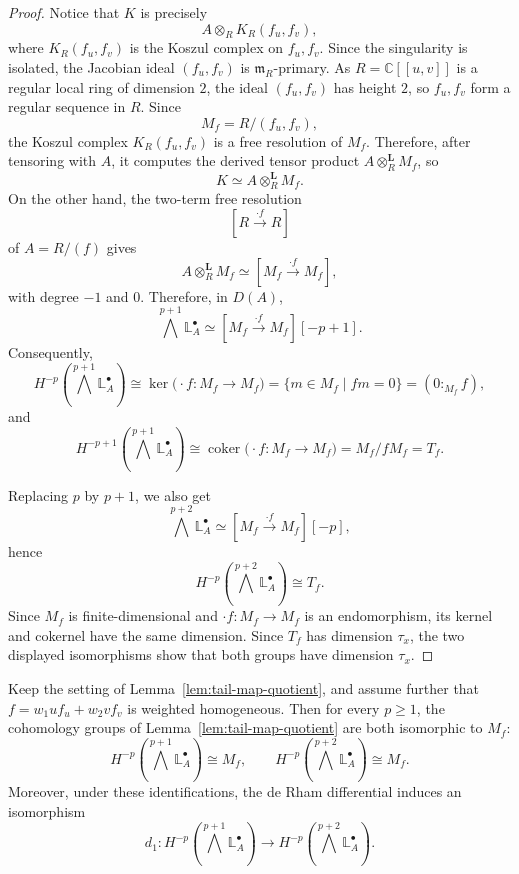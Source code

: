 \documentclass[12pt,reqno]{amsart}
\begin{document}
\begin{proof}
Notice that $K$ is precisely
\[
A\otimes_R K_R(f_u,f_v),
\]
where $K_R(f_u,f_v)$ is the Koszul complex on \(f_u,f_v\). Since the singularity is isolated, the Jacobian ideal \((f_u,f_v)\) is \(\mathfrak m_R\)-primary. As \(R=\mathbb C[[u,v]]\) is a regular local ring of dimension \(2\), the ideal \((f_u,f_v)\) has height \(2\), so \(f_u,f_v\) form a regular sequence in \(R\). Since
\[
M_f=R/(f_u,f_v),
\]
the Koszul complex \(K_R(f_u,f_v)\) is a free resolution of \(M_f\). Therefore, after tensoring with \(A\), it computes the derived tensor product \(A\otimes_R^{\mathbf L}M_f\), so
\[
K \simeq A\otimes_R^{\mathbf L} M_f.
\]
On the other hand, the two-term free resolution
\[
[R\xrightarrow{\cdot f} R]
\]
of $A=R/(f)$ gives
\[
A\otimes_R^{\mathbf L}M_f \simeq [M_f\xrightarrow{\cdot f} M_f],
\]
with degree \(-1\) and \(0\). Therefore, in \(D(A)\),
\[
\bigwedge^{p+1}\mathbb{L}^{\bullet}_A\simeq [M_f\xrightarrow{\cdot f} M_f][-p+1].
\]
Consequently,
\[
  H^{-p}\!\left(\bigwedge^{p+1}\mathbb{L}^{\bullet}_A\right)
  \cong
  \ker\!\bigl(\cdot f:M_f\to M_f\bigr)
  =
  \{m\in M_f\mid fm=0\}
  =(0:_{M_f}f),
  \]
  and
  \[
  H^{-p+1}\!\left(\bigwedge^{p+1}\mathbb{L}^{\bullet}_A\right)
  \cong
  \operatorname{coker}\!\bigl(\cdot f:M_f\to M_f\bigr)
  =M_f/fM_f=T_f.
  \]
  
  Replacing $p$ by $p+1$, we also get
  \[
  \bigwedge^{p+2}\mathbb{L}^{\bullet}_A\simeq [M_f\xrightarrow{\cdot f} M_f][-p],
  \]
  hence
  \[
  H^{-p}\!\left(\bigwedge^{p+2}\mathbb{L}^{\bullet}_A\right)\cong T_f.
  \]
  Since \(M_f\) is finite-dimensional and \(\cdot f:M_f\to M_f\) is an endomorphism, its kernel and cokernel have the same dimension. Since \(T_f\) has dimension \(\tau_x\), the two displayed isomorphisms show that both groups have dimension \(\tau_x\).
  \end{proof}

\begin{lemma}\label{lem:tail-map-euler}
Keep the setting of Lemma~\ref{lem:tail-map-quotient}, and assume further that \(f=w_1u f_u+w_2v f_v\) is weighted homogeneous. Then for every $p\ge 1$, the cohomology groups of Lemma~\ref{lem:tail-map-quotient} are both isomorphic to \(M_f\):
\[
H^{-p}\!\left(\bigwedge^{p+1}\mathbb{L}^{\bullet}_A\right)\cong M_f,
\qquad
H^{-p}\!\left(\bigwedge^{p+2}\mathbb{L}^{\bullet}_A\right)\cong M_f.
\]
Moreover, under these identifications, the de Rham differential induces an isomorphism
\[
d_1:
H^{-p}\!\left(\bigwedge^{p+1}\mathbb{L}^{\bullet}_A\right)
\longrightarrow
H^{-p}\!\left(\bigwedge^{p+2}\mathbb{L}^{\bullet}_A\right).
\]
\end{lemma}
\end{document}
